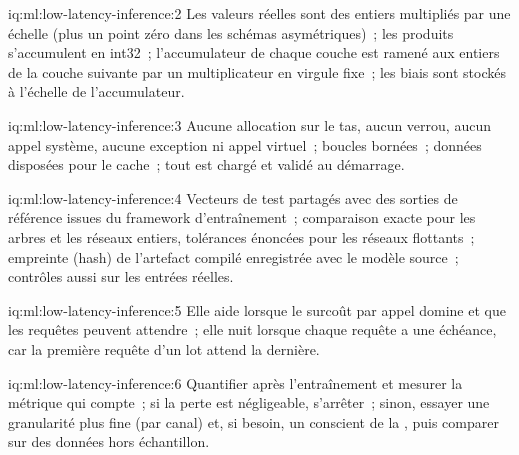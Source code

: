 \begin{solution}{iq:ml:low-latency-inference:2}
Les valeurs réelles sont des entiers multipliés par une échelle (plus un point zéro dans les schémas asymétriques)~; les produits
s'accumulent en int32~; l'accumulateur de chaque couche est ramené aux entiers de la couche suivante par un multiplicateur en virgule fixe~; les biais sont stockés à l'échelle de l'accumulateur.
\end{solution}

\begin{solution}{iq:ml:low-latency-inference:3}
Aucune allocation sur le tas, aucun verrou, aucun appel système, aucune exception ni appel virtuel~; boucles bornées~; données
disposées pour le cache~; tout est chargé et validé au démarrage.
\end{solution}

\begin{solution}{iq:ml:low-latency-inference:4}
Vecteurs de test partagés avec des sorties de référence issues du framework d'entraînement~; comparaison exacte pour les arbres et les réseaux entiers, tolérances énoncées
pour les réseaux flottants~; empreinte (hash) de l'artefact compilé enregistrée avec le modèle source~; contrôles aussi sur les entrées réelles.
\end{solution}

\begin{solution}{iq:ml:low-latency-inference:5}
Elle aide lorsque le surcoût par appel domine et que les requêtes peuvent attendre~; elle nuit lorsque chaque requête a une échéance, car la première
requête d'un lot attend la dernière.
\end{solution}

\begin{solution}{iq:ml:low-latency-inference:6}
Quantifier après l'entraînement et mesurer la métrique qui compte~; si la perte est négligeable, s'arrêter~; sinon, essayer une granularité plus fine
(par canal) et, si besoin, un  conscient de la , puis comparer sur des données hors échantillon.
\end{solution}
